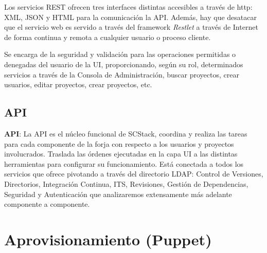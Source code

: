 \par Los servicios REST ofrecen tres interfaces distintas accesibles a través de http: XML, JSON y HTML para la comunicación la API. Además, hay que desatacar que el servicio web es servido a través del framework \emph{Restlet} a través de Internet de forma continua y remota a cualquier usuario o proceso cliente.

\par Se encarga de la seguridad y validación para las operaciones permitidas o denegadas del usuario de la UI, proporcionando, según su rol, determinados servicios a través de la Consola de Administración, buscar proyectos, crear usuarios, editar proyectos, crear proyectos, etc.



\subsection{API}
\label{sub:api}

\par \textbf{API}: La API es el núcleo funcional de SCStack, coordina y realiza las tareas para cada componente de la forja con respecto a los usuarios y proyectos involucrados. Traslada las órdenes ejecutadas en la capa UI a las distintas herramientas para configurar su funcionamiento. Está conectada a todos los servicios que ofrece pivotando a través del directorio LDAP: Control de Versiones, Directorios, Integración Continua, ITS, Revisiones, Gestión de Dependencias, Seguridad y Autenticación que analizaremos extensamente más adelante componente a componente.




\section{Aprovisionamiento (Puppet)}
\label{sec:puppet}

